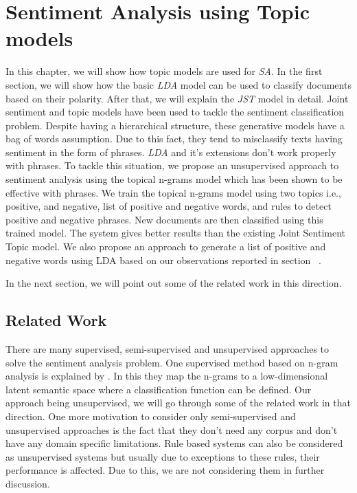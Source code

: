 
\chapter{Sentiment Analysis using Topic models} %

\label{topicmodeledsa} %



In this chapter, we will show how topic models are used for \textit{SA}. In the first section, we will show how the basic \textit{LDA} model can be used  to classify 
documents based on their polarity. After that, we will explain the \textit{JST} model in detail. Joint sentiment and topic models have been used to tackle the sentiment 
classification problem. Despite having a hierarchical structure, these generative models have a bag of words assumption. Due to this fact, they tend to misclassify 
texts having sentiment in the form of phrases. \textit{LDA} and it's extensions don't work properly with phrases. To tackle this situation, we propose an unsupervised 
approach to sentiment analysis using the topical n-grams model which has been shown to be effective with phrases. We train the topical n-grams model using two topics 
i.e., positive, and negative, list of positive and negative words, and rules to detect positive and negative phrases. New documents are then classified using this trained 
model. The system gives better results than the existing Joint Sentiment Topic model. We also propose an approach to generate a list of positive and negative words using
LDA based on our observations reported in section ~.

In the next section, we will point out some of the related work in this direction.

\section{Related Work}

There are many supervised, semi-supervised and unsupervised approaches to solve the sentiment analysis problem. One supervised method based on n-gram analysis is explained
by \citep*{bespalov2011sentiment}. In this they map the n-grams to a low-dimensional latent semantic space where a classification function can be defined. Our approach being
unsupervised, we will go through some of the related work in that direction. One more motivation to consider only semi-supervised and unsupervised approaches is the fact that
they don't need any corpus and don't have any domain specific limitations. Rule based systems can also be considered as unsupervised systems but usually due to exceptions to
these rules, their performance is affected. Due to this, we are not considering them in further discussion.

